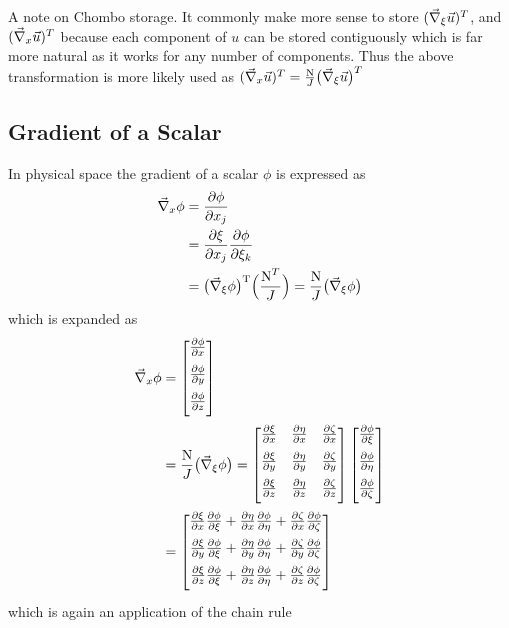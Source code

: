 A note on Chombo storage. It commonly make more sense to store $({\vec{\nabla}}_{\xi} \vec{u})^T$, and $({\vec{\nabla}}_{x} \vec{u})^T$ because each component of $u$ can be stored contiguously which is far more natural as it works for any number of components. Thus the above transformation is more likely used as $({\vec{\nabla}}_x \vec{u})^T = \frac{{{\text{N}}}}{J} \big({\vec{\nabla}}_{\xi} \vec{u} \big)^T$


\subsection{Gradient of a Scalar}
In physical space the gradient of a scalar $\phi$ is expressed as
\begin{align*}
  \vecnabla_x \phi
  &= \fpartial{\phi}{x_j}{1} \\
  &= \fpartial{\xi}{x_j}{1} \fpartial{\phi}{\xi_k}{1} \\
  &= \big(\vecnabla_{\xi} \phi \big)^{\rm{T}} \Big( \NtJ \Big) = \NJ \big(\vecnabla_{\xi} \phi \big) \\
\end{align*}
which is expanded as
\begin{align*}
  \vecnabla_x \phi
  &= \gradVec{\phi}{x}{y}{z} \\
  &= \NJ \big(\vecnabla_{\xi} \phi \big) = \metricT \gradVec{\phi}{\xi}{\eta}{\zeta} \\
  &= 
    \begin{bmatrix}
      \fpartial{\xi}{x}{1}\fpartial{\phi}{\xi}{1} + \fpartial{\eta}{x}{1}\fpartial{\phi}{\eta}{1} + \fpartial{\zeta}{x}{1}\fpartial{\phi}{\zeta}{1} \\[1.5ex]
      \fpartial{\xi}{y}{1}\fpartial{\phi}{\xi}{1} + \fpartial{\eta}{y}{1}\fpartial{\phi}{\eta}{1} + \fpartial{\zeta}{y}{1}\fpartial{\phi}{\zeta}{1} \\[1.5ex]
      \fpartial{\xi}{z}{1}\fpartial{\phi}{\xi}{1} + \fpartial{\eta}{z}{1}\fpartial{\phi}{\eta}{1} + \fpartial{\zeta}{z}{1}\fpartial{\phi}{\zeta}{1} \\[1.5ex]
    \end{bmatrix}
\end{align*}
which is again an application of the chain rule

